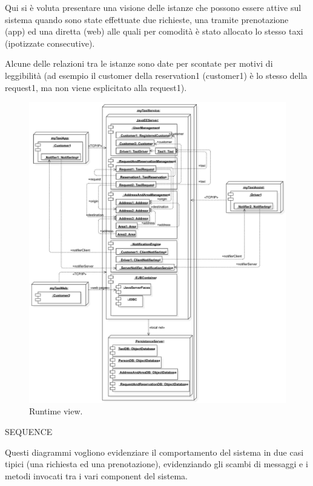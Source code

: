 Qui si è voluta presentare una visione delle istanze che possono essere attive sul sistema quando sono state effettuate due richieste, una tramite prenotazione (app) ed una diretta (web) alle quali per comodità è stato allocato lo stesso taxi (ipotizzate consecutive).

Alcune delle relazioni tra le istanze sono date per scontate per motivi di leggibilità (ad esempio il customer della reservation1 (customer1) è lo stesso della request1, ma non viene esplicitato alla request1).


\begin{figure}%
	\centering%
	\includegraphics[width=\linewidth]{img/Runtime__RuntimeView_5}%
	\caption{Runtime view.}\label{fig:runtime}%
\end{figure}



SEQUENCE

Questi diagrammi vogliono evidenziare il comportamento del sistema in due casi tipici (una richiesta ed una prenotazione), evidenziando gli scambi di messaggi e i metodi invocati tra i vari component del sistema.



